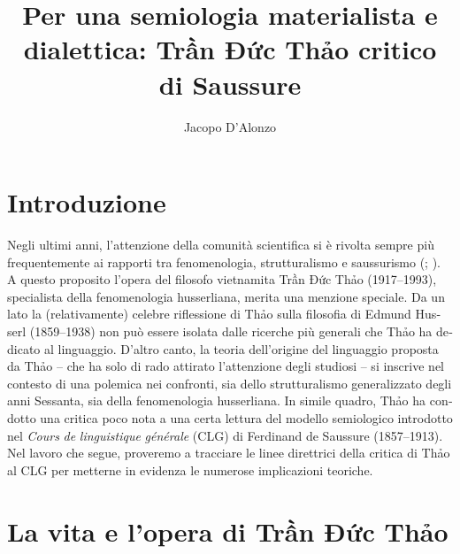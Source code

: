 \documentclass[output=paper]{../langscibook}
\author{Jacopo D’Alonzo\affiliation{Sapienza Università di Roma}\orcid{}}
\title{Per una semiologia materialista e dialettica: Trần Đức Thảo critico di Saussure}
\begin{document}
\begin{otherlanguage}{italian}
\maketitle

\section{Introduzione} 

 Negli ultimi anni, l’attenzione della comunità scientifica si è rivolta sempre più frequentemente ai rapporti tra fenomenologia, strutturalismo e saussurismo (\citealt{de_palo_saussure_2016}; \citealt{aurora_filosofia_2017}). A questo proposito l’opera del filosofo vietnamita Trần Đức Thảo (1917--1993), specialista della fenomenologia husserliana, merita una menzione speciale. Da un lato la (relativamente) celebre riflessione di Thảo sulla filosofia di Edmund Husserl (1859--1938) non può essere isolata dalle ricerche più generali che Thảo ha dedicato al linguaggio. D’altro canto, la teoria dell’origine del linguaggio proposta da Thảo – che ha solo di rado attirato l’attenzione degli studiosi – si inscrive nel contesto di una polemica nei confronti, sia dello strutturalismo generalizzato degli anni Sessanta, sia della fenomenologia husserliana. In simile quadro, Thảo ha condotto una critica poco nota a una certa lettura del modello semiologico introdotto nel \textit{Cours} \textit{de} \textit{linguistique} \textit{générale} (CLG) di Ferdinand de Saussure (1857--1913). Nel lavoro che segue, proveremo a tracciare le linee direttrici della critica di Thảo al CLG per metterne in evidenza le numerose implicazioni teoriche.

\section{La vita e l’opera di Trần Đức Thảo} 


\end{otherlanguage}
\end{document}

